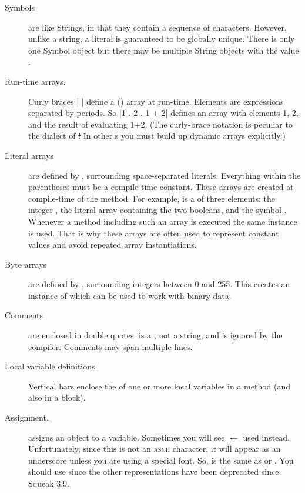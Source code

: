 \documentclass[a4paper,10pt,twoside]{book}
\begin{document}
\begin{description}
\item[Symbols] are like Strings, in that they contain a sequence of characters.
	However, unlike a string, a literal  is guaranteed to be globally unique.
	There is only one Symbol object  but there may be multiple String objects with the value .

\item[Run-time arrays.]
	Curly braces \ct|{ }| define a () array at run-time.
	Elements are expressions separated by periods.
	So \ct|{1 . 2 . 1 + 2}| defines an array with elements 1, 2, and the result of evaluating 1+2.
	(The curly-brace notation is peculiar to the \sq dialect of \st!
	In other \st{}s you must build up dynamic arrays explicitly.)

\item[Literal arrays] are defined by \ct{#( )}, surrounding space-separated literals.
	Everything within the parentheses must be a compile-time constant.
	These arrays are created at compile-time of the method.
	For example,  is a   of three elements: the integer , the literal array containing the two booleans, and the symbol .
	Whenever a method including such an array is executed the same instance is used.
	That is why these arrays are often used to represent constant values and avoid repeated array instantiations.

\item[Byte arrays] are defined by \ct{#[ ]}, surrounding integers between 0 and 255.
	This creates an instance of  which can be used to work with binary data.

\item[Comments] are enclosed in double quotes.
	 is a , not a string, and is ignored by the \sq compiler.
	Comments may span multiple lines.

\item[Local variable definitions.]
	Vertical bars \ct{| |} enclose the  of one or more local variables in a method (and also in a block).

\item[Assignment.]
	\ct{:=} assigns an object to a variable.
	Sometimes you will see $\leftarrow$ used instead.
	Unfortunately, since this is not an \textsc{ascii} character, it will appear as an underscore unless you are using a special font.
	So,  is the same as  or .
	You should use \ct{:=} since the other representations have been deprecated since Squeak 3.9.


\end{description}
\end{document}
